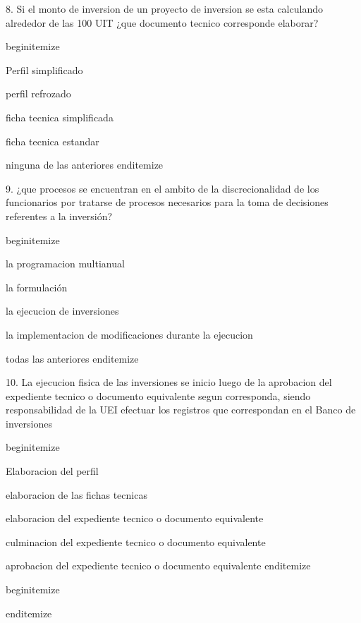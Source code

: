 8. Si el monto de inversion de un proyecto de inversion se esta calculando alrededor de las 100 UIT ¿que documento tecnico corresponde elaborar? 

begin{itemize}
			\item Perfil simplificado
 			\item perfil refrozado
			\item ficha tecnica simplificada
			\item ficha tecnica estandar
			\item ninguna de las anteriores 
end{itemize}

9. ¿que procesos se encuentran en el ambito de la discrecionalidad de los funcionarios por tratarse de procesos necesarios para la toma de decisiones referentes a la inversión?

begin{itemize}
			\item la programacion multianual
 			\item la formulación 
			\item la ejecucion de inversiones 
			\item la implementacion de modificaciones durante la ejecucion
			\item todas las anteriores
end{itemize}

10. La ejecucion fisica de las inversiones se inicio luego de la aprobacion del expediente tecnico o documento equivalente segun corresponda, siendo responsabilidad de la UEI efectuar los registros que correspondan en el Banco de inversiones 

begin{itemize}
			\item Elaboracion del perfil
 			\item elaboracion de las fichas tecnicas
			\item elaboracion del expediente tecnico o documento equivalente 
			\item culminacion del expediente tecnico o documento equivalente 
			\item aprobacion del expediente tecnico o documento equivalente 
end{itemize}


begin{itemize}
			\item
 			\item
			\item
			\item
			\item
end{itemize}


















